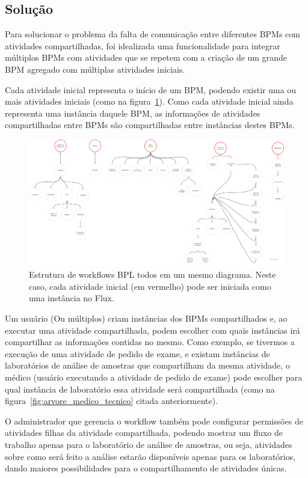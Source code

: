 \subsection{Solução}

Para solucionar o problema da falta de comunicação entre diferentes BPMs com atividades compartilhadas, foi idealizada uma funcionalidade para integrar múltiplos BPMs com atividades que se repetem com a criação de um grande BPM agregado com múltiplas atividades iniciais.

Cada atividade inicial representa o início de um BPM, podendo existir uma ou mais atividades iniciais (como na figura~\ref{fig:bpl_completo}).
Como cada atividade inicial ainda representa uma instância daquele BPM, as informações de atividades compartilhadas entre BPMs são compartilhadas entre instâncias destes BPMs.

\begin{figure}
    \centering
    \includegraphics[width=1\textwidth]{imgs/BPL/bpl_completo.png}
    \caption{Estrutura de workflows BPL todos em um mesmo diagrama. Neste caso, cada atividade inicial (em vermelho) pode ser iniciada como uma instância no Flux.}
    \label{fig:bpl_completo}
\end{figure}

Um usuário (Ou múltiplos) criam instâncias dos BPMs compartilhados e, ao executar uma atividade compartilhada, podem escolher com quais instâncias irá compartilhar as informações contidas no mesmo.
Como exemplo, se tivermos a execução de uma atividade de pedido de exame, e existam instâncias de laboratórios de análise de amostras que compartilham da mesma atividade, o médico (usuário executando a atividade de pedido de exame) pode escolher para qual instância de laboratório essa atividade será compartilhada (como na figura~\ref{fig:arvore_medico_tecnico} citada anteriormente).

O administrador que gerencia o workflow também pode configurar permissões de atividades filhas da atividade compartilhada, podendo mostrar um fluxo de trabalho apenas para o laboratório de análise de amostras, ou seja, atividades sobre como será feito a análise estarão disponíveis apenas para os laboratórios, dando maiores possibilidades para o compartilhamento de atividades únicas.

